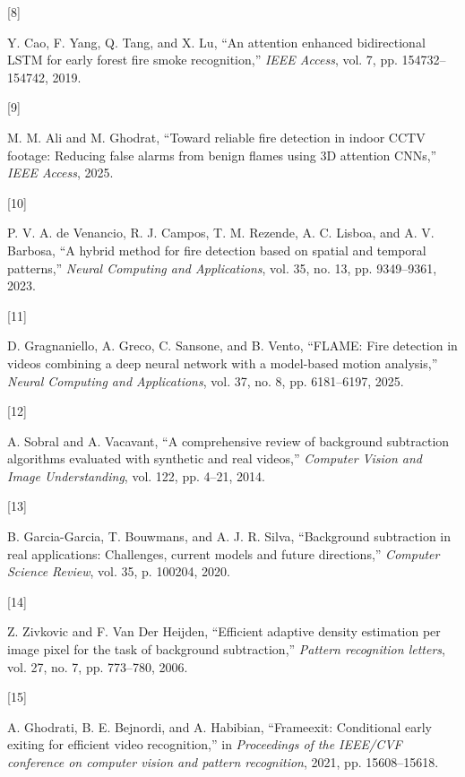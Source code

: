 \documentclass[
  10pt,
]{article}
\newlength{\cslhangindent}
\newlength{\csllabelwidth}
\newenvironment{CSLReferences}[2] %
 {\begin{list}{}{%
  \setlength{\itemindent}{0pt}
  \setlength{\leftmargin}{0pt}
  \setlength{\parsep}{0pt}
  \ifodd #1
   \setlength{\leftmargin}{\cslhangindent}
   \setlength{\itemindent}{-1\cslhangindent}
  \fi
  \setlength{\itemsep}{#2\baselineskip}}}
 {\end{list}}
\newcommand{\CSLLeftMargin}[1]{\parbox[t]{\csllabelwidth}{\strut#1\strut}}
\newcommand{\CSLRightInline}[1]{\parbox[t]{\linewidth - \csllabelwidth}{\strut#1\strut}}
\begin{document}
\begin{CSLReferences}{0}{0}
\CSLLeftMargin{{[}8{]} }%
\CSLRightInline{Y. Cao, F. Yang, Q. Tang, and X. Lu, {``An attention
enhanced bidirectional LSTM for early forest fire smoke recognition,''}
\emph{IEEE Access}, vol. 7, pp. 154732--154742, 2019.}

\CSLLeftMargin{{[}9{]} }%
\CSLRightInline{M. M. Ali and M. Ghodrat, {``Toward reliable fire
detection in indoor CCTV footage: Reducing false alarms from benign
flames using 3D attention CNNs,''} \emph{IEEE Access}, 2025.}

\CSLLeftMargin{{[}10{]} }%
\CSLRightInline{P. V. A. de Venancio, R. J. Campos, T. M. Rezende, A. C.
Lisboa, and A. V. Barbosa, {``A hybrid method for fire detection based
on spatial and temporal patterns,''} \emph{Neural Computing and
Applications}, vol. 35, no. 13, pp. 9349--9361, 2023.}

\CSLLeftMargin{{[}11{]} }%
\CSLRightInline{D. Gragnaniello, A. Greco, C. Sansone, and B. Vento,
{``FLAME: Fire detection in videos combining a deep neural network with
a model-based motion analysis,''} \emph{Neural Computing and
Applications}, vol. 37, no. 8, pp. 6181--6197, 2025.}

\CSLLeftMargin{{[}12{]} }%
\CSLRightInline{A. Sobral and A. Vacavant, {``A comprehensive review of
background subtraction algorithms evaluated with synthetic and real
videos,''} \emph{Computer Vision and Image Understanding}, vol. 122, pp.
4--21, 2014.}

\CSLLeftMargin{{[}13{]} }%
\CSLRightInline{B. Garcia-Garcia, T. Bouwmans, and A. J. R. Silva,
{``Background subtraction in real applications: Challenges, current
models and future directions,''} \emph{Computer Science Review}, vol.
35, p. 100204, 2020.}

\CSLLeftMargin{{[}14{]} }%
\CSLRightInline{Z. Zivkovic and F. Van Der Heijden, {``Efficient
adaptive density estimation per image pixel for the task of background
subtraction,''} \emph{Pattern recognition letters}, vol. 27, no. 7, pp.
773--780, 2006.}

\CSLLeftMargin{{[}15{]} }%
\CSLRightInline{A. Ghodrati, B. E. Bejnordi, and A. Habibian,
{``Frameexit: Conditional early exiting for efficient video
recognition,''} in \emph{Proceedings of the IEEE/CVF conference on
computer vision and pattern recognition}, 2021, pp. 15608--15618.}


\end{CSLReferences}
\end{document}
